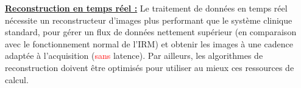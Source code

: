 \underline{\textbf{Reconstruction en temps réel :}} Le traitement de données en temps réel nécessite un reconstructeur d’images plus performant que le système clinique standard, pour gérer un flux de données nettement supérieur (en comparaison avec le fonctionnement normal de l’IRM) et obtenir les images à une cadence adaptée à l’acquisition (\textcolor{red}{sans} latence). Par ailleurs, les algorithmes de reconstruction doivent être optimisés pour utiliser au mieux ces ressources de calcul.\\